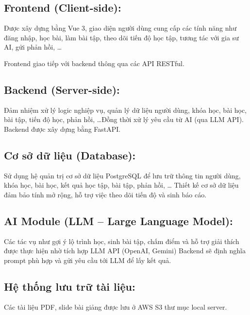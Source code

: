 \subsection{Frontend (Client-side):}
Được xây dựng bằng Vue 3, giao diện người dùng cung cấp các tính năng như đăng nhập, học bài, làm bài tập, theo dõi tiến độ học tập, tương tác với gia sư AI, gửi phản hồi, \dots

Frontend giao tiếp với backend thông qua các API RESTful.

\subsection{Backend (Server-side):}
Đảm nhiệm xử lý logic nghiệp vụ, quản lý dữ liệu người dùng, khóa học, bài học, bài tập, tiến độ học, phản hồi, \dots Đồng thời xử lý yêu cầu từ AI (qua LLM API).
Backend được xây dựng bằng FastAPI. 
\subsection{Cơ sở dữ liệu (Database):}
Sử dụng hệ quản trị cơ sở dữ liệu PostgreSQL để lưu trữ thông tin người dùng, khóa học, bài học, kết quả học tập, bài tập, phản hồi, \dots
Thiết kế cơ sở dữ liệu đảm bảo tính mở rộng, hỗ trợ việc theo dõi tiến độ và sinh báo cáo.

\subsection{AI Module (LLM – Large Language Model):}
Các tác vụ như gợi ý lộ trình học, sinh bài tập, chấm điểm và hỗ trợ giải thích được thực hiện nhờ tích hợp LLM API (OpenAI, Gemini)
Backend sẽ định nghĩa prompt phù hợp và gửi yêu cầu tới LLM để lấy kết quả.

\subsection{Hệ thống lưu trữ tài liệu:}
Các tài liệu PDF, slide bài giảng được lưu ở AWS S3 thư mục local server.


